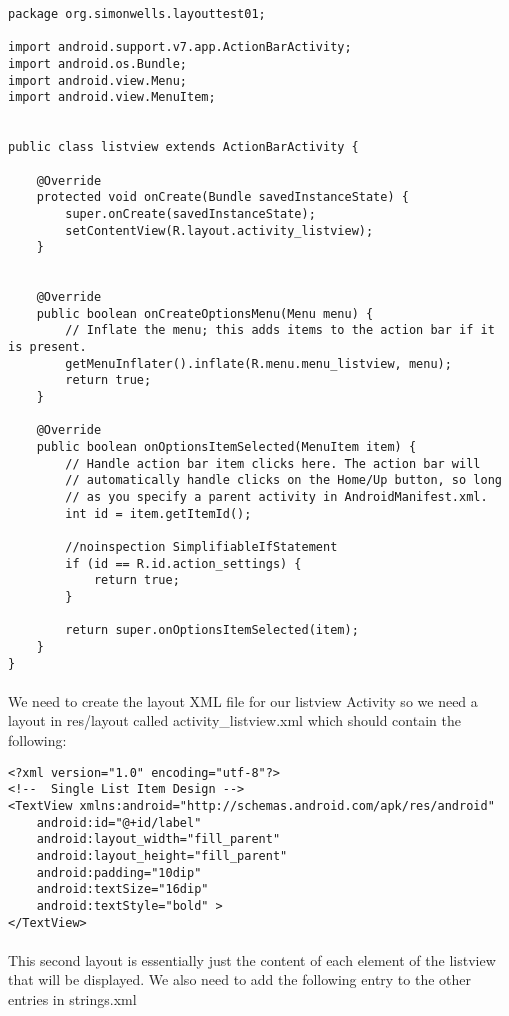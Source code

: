 \begin{lstlisting}
package org.simonwells.layouttest01;

import android.support.v7.app.ActionBarActivity;
import android.os.Bundle;
import android.view.Menu;
import android.view.MenuItem;


public class listview extends ActionBarActivity {

    @Override
    protected void onCreate(Bundle savedInstanceState) {
        super.onCreate(savedInstanceState);
        setContentView(R.layout.activity_listview);
    }


    @Override
    public boolean onCreateOptionsMenu(Menu menu) {
        // Inflate the menu; this adds items to the action bar if it is present.
        getMenuInflater().inflate(R.menu.menu_listview, menu);
        return true;
    }

    @Override
    public boolean onOptionsItemSelected(MenuItem item) {
        // Handle action bar item clicks here. The action bar will
        // automatically handle clicks on the Home/Up button, so long
        // as you specify a parent activity in AndroidManifest.xml.
        int id = item.getItemId();

        //noinspection SimplifiableIfStatement
        if (id == R.id.action_settings) {
            return true;
        }

        return super.onOptionsItemSelected(item);
    }
}
\end{lstlisting}

\paragraph{} We need to create the layout XML file for our listview Activity so we need a layout in res/layout called activity\_listview.xml which should contain the following:

\begin{lstlisting}
<?xml version="1.0" encoding="utf-8"?>
<!--  Single List Item Design -->
<TextView xmlns:android="http://schemas.android.com/apk/res/android"
    android:id="@+id/label"
    android:layout_width="fill_parent"
    android:layout_height="fill_parent"
    android:padding="10dip"
    android:textSize="16dip"
    android:textStyle="bold" >
</TextView>
\end{lstlisting}

\paragraph{} This second layout is essentially just the content of each element of the listview that will be displayed. We also need to add the following entry to the other entries in strings.xml

